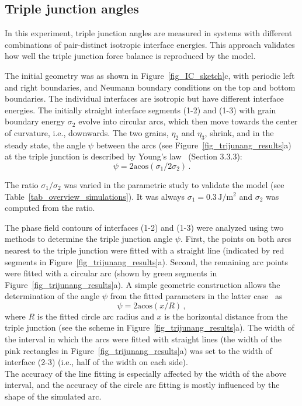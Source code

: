 \subsection{Triple junction angles}

In this experiment, triple junction angles are measured in systems with different combinations of pair-distinct isotropic interface energies. This approach validates how well the triple junction force balance is reproduced by the model.

The initial geometry was as shown in Figure~\ref{fig_IC_sketch}c, with periodic left and right boundaries, and Neumann boundary conditions on the top and bottom boundaries. The individual interfaces are isotropic but have different interface energies. The initially straight interface segments (1-2) and (1-3) with grain boundary energy $\sigma_2$ evolve into circular arcs, which then move towards the center of curvature, i.e., downwards. The two grains, $\eta_2$ and $\eta_3$, shrink, and in the steady state, the angle $\psi$ between the arcs (see Figure~\ref{fig_trijunang_results}a) at the triple junction is described by Young's law~\cite{Porter2009} (Section 3.3.3):
\begin{equation}
	\psi = 2\mathrm{acos}(\sigma_{1}/2\sigma_{2}) \,.
\end{equation}

The ratio $\sigma_1/\sigma_2$ was varied in the parametric study to validate the model (see Table~\ref{tab_overview_simulations}). It was always $\sigma_1=0.3\,\mathrm{J/m^2}$ and $\sigma_2$ was computed from the ratio.

The phase field contours of interfaces (1-2) and (1-3) were analyzed using two methods to determine the triple junction angle $\psi$. First, the points on both arcs nearest to the triple junction were fitted with a straight line (indicated by red segments in Figure~\ref{fig_trijunang_results}a). Second, the remaining arc points were fitted with a circular arc (shown by green segments in Figure~\ref{fig_trijunang_results}a). A simple geometric construction allows the determination of the angle $\psi$ from the fitted parameters in the latter case~\cite{Moelans2009} as
\begin{equation}
	\psi = 2\mathrm{acos}(x/R)\,,
\end{equation}
where $R$ is the fitted circle arc radius and $x$ is the horizontal distance from the triple junction (see the scheme in Figure~\ref{fig_trijunang_results}a). The width of the interval in which the arcs were fitted with straight lines (the width of the pink rectangles in Figure~\ref{fig_trijunang_results}a) was set to the width of interface (2-3) (i.e., half of the width on each side).\\
The accuracy of the line fitting is especially affected by the width of the above interval, and the accuracy of the circle arc fitting is mostly influenced by the shape of the simulated arc.


